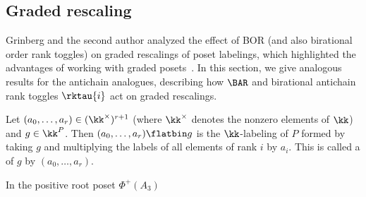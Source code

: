 \subsection{Graded rescaling}\label{ss:g-rescaling}

Grinberg and the second author analyzed the effect of BOR (and also birational order rank
toggles) on graded rescalings of poset labelings, which highlighted the advantages of working with
graded posets~\cite{GrRo16}. In this section, we give analogous results for the antichain
analogues, describing how $\BAR$ and birational antichain rank toggles $\rktau{i}$ act on
graded rescalings.

\begin{defi}\label{defn:graded_resc}
Let $(a_0,\dots,a_r)\in(\kk^\times)^{r+1}$ (where $\kk^{\times}$ denotes the nonzero elements of
$\kk$) and
$g\in\kk^P$.
Then $(a_0,\dots,a_r)\flatbin g$ is the $\kk$-labeling of $P$
formed by taking $g$ and multiplying the labels of all elements of rank $i$
by $a_i$. This is called a  of $g$ by $(a_0,\dots,a_r)$.
\end{defi}

\begin{exam}In the positive root poset $\Phi^+(A_3)$

\begin{center}
\end{center}
\end{exam}


